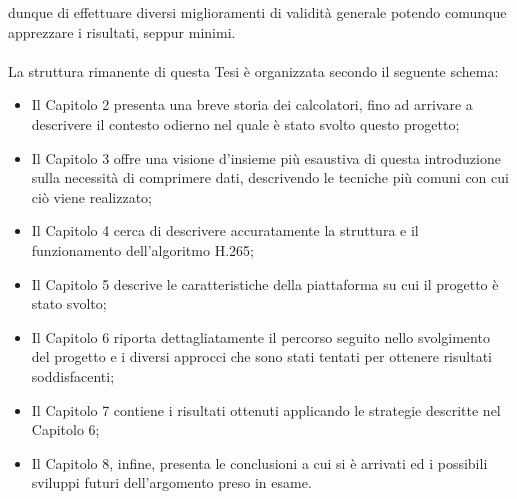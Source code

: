 dunque di effettuare diversi miglioramenti di validità generale potendo comunque
apprezzare i risultati, seppur minimi.
\\ \\
La struttura rimanente di questa Tesi è organizzata secondo il seguente schema:
\begin{itemize}
\item Il Capitolo 2 presenta una breve storia dei calcolatori, fino ad arrivare
      a descrivere il contesto odierno nel quale è stato svolto questo progetto;
\item Il Capitolo 3 offre una visione d'insieme più esaustiva di questa 
      introduzione sulla necessità di comprimere dati, descrivendo le tecniche
      più comuni con cui ciò viene realizzato;
\item Il Capitolo 4 cerca di descrivere accuratamente la struttura e il
      funzionamento dell'algoritmo H.265;
\item Il Capitolo 5 descrive le caratteristiche della piattaforma su cui il
      progetto è stato svolto;
\item Il Capitolo 6 riporta dettagliatamente il percorso seguito nello 
      svolgimento del progetto e i diversi approcci che sono stati tentati per
      ottenere risultati soddisfacenti;
\item Il Capitolo 7 contiene i risultati ottenuti applicando le strategie
      descritte nel Capitolo 6;
\item Il Capitolo 8, infine, presenta le conclusioni a cui si è arrivati ed i
      possibili sviluppi futuri dell'argomento preso in esame.
\end{itemize}
